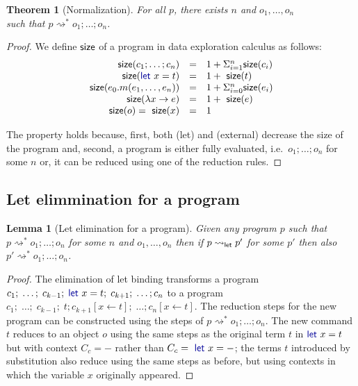 \documentclass[english,crc]{programming}
\newcounter{thc}
\theoremstyle{plain}
\newtheorem{lem}[thc]{Lemma}
\newtheorem{theorem}[thc]{Theorem}
\theoremstyle{definition}
\newcommand{\ident}[1]{\textnormal{\textcolor{idclr}{\sffamily #1}}}
\newcommand{\kvd}[1]{\textnormal{\textcolor{kvdclr}{\sffamily #1}}}
\newcommand{\rname}[1]{{\sffamily(#1)}}
\begin{document}
\begin{theorem}[Normalization]
For all $p$, there exists $n$ and $o_1, \ldots, o_n$ \\
such that $p\rightsquigarrow^{*} o_1;\ldots;o_n$.
\end{theorem}
\begin{proof}
We define $\ident{size}$ of a program in data exploration calculus as follows:
\begin{equation}
\begin{array}{rcl}
\ident{size}(c_1; \ldots; c_n) &=& 1 + \Sigma^{n}_{i=1} \ident{size}(c_i)\\
\ident{size}(\kvd{let}~x=t) &=& 1 + \ident{size}(t)\\
\ident{size}(e_0.m(e_1, \ldots, e_n)) &=& 1 + \Sigma^{n}_{i=0} \ident{size}(e_i)\\
\ident{size}(\lambda x\rightarrow e) &=& 1 + \ident{size}(e)\\
\ident{size}(o) = \ident{size}(x) &=& 1\\
\end{array}
\end{equation}

\noindent
The property holds because, first, both \rname{let} and \rname{external} decrease the \ident{size}
of the program and, second, a program is either fully evaluated, i.e.~$o_1;\ldots;o_n$ for some $n$
or, it can be reduced using one of the reduction rules.
\end{proof}


\subsection{Let elimmination for a program}
\label{sec:let-lang-elimination}

\begin{lem}[Let elimination for a program]
\label{thm:let-lang-elimination-proof}
Given any program $p$ such that $p \rightsquigarrow^{*} o_1;\ldots;o_n$ for some $n$ and $o_1, \ldots, o_n$
then if $p \rightsquigarrow_\ident{let} p'$ for some $p'$ then also $p' \rightsquigarrow^{*} o_1;\ldots;o_n$.
\end{lem}
\begin{proof}
The elimination of let binding transforms a program $c_1;\; \ldots;\; c_{k-1};\; \kvd{let}~x=t;\; c_{k+1};\; \ldots; c_n$
to a program $c_1;\; \ldots;\; c_{k-1};\; t; c_{k+1}[x\leftarrow t];\; \ldots; c_n[x\leftarrow t]$.
The reduction steps for the new program can be constructed using the steps of $p \rightsquigarrow^{*} o_1;\ldots;o_n$.
The new command $t$ reduces to an object $o$ using the same steps as the original term $t$
in $\kvd{let}~x=t$ but with context $C_c = -$ rather than $C_c = \kvd{let}~x=-$; the terms $t$
introduced by substitution also reduce using the same steps as before, but using
contexts in which the variable $x$ originally appeared.
\end{proof}
\end{document}
